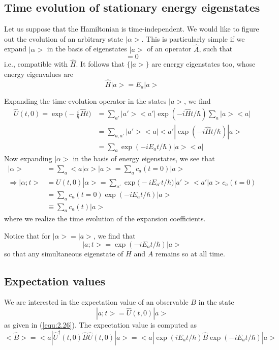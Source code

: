 \subsection{Time evolution of stationary energy eigenstates}
Let us suppose that the Hamiltonian is time-independent. We
would like to figure out the evolution of an arbitrary state
$|\alpha>$. This is particularly simple if we expand
$|\alpha>$ in the basis of eigenstates $|a>$ of an operator
$\hat{A}$, such that
\begin{equation}
  [\hat{A}, \hat{H}] = 0
  \label{equ:2.22}
\end{equation}
i.e., compatible with $\hat{H}$. It follows that $\{|a>\}$
are energy eigenstates too, whose energy eigenvalues are
\begin{equation}
  \hat{H} |a> = E_a |a>
  \label{equ:2.23}
\end{equation}

Expanding the time-evolution operator in the states $|a>$,
we find
\begin{align}
  \hat{U}(t, 0) = \exp\Big(-\frac{i}{\hbar} \hat{H}t\Big) &= 
  \sum_{a'} |a'><a'| \exp(-i \hat{H} t / \hbar) \sum_a
  |a><a|\nonumber\\
  &=
  \sum_{a,a'} |a'><a| <a'|\exp(-i\hat{H}t/\hbar)
  |a>\nonumber\\
  &=
  \sum_a \exp(-i E_a t /\hbar) |a><a|
  \label{equ:2.23}
\end{align}
Now expanding $|\alpha>$ in the basis of energy eigenstates,
we see that
\begin{align*}
|\alpha> &= \sum_a <a|\alpha> |a> = \sum_a c_a(t=0) |a>
  \nonumber\\
  \Rightarrow |\alpha;t> &= U(t,0) |\alpha> = \sum_{a'}
  \exp\Big(-i E_{a'}t/\hbar\Big) |a'><a'|a> c_a(t=0)
  \nonumber\\
  &=
  \sum_a c_a(t= 0) \exp(-iE_a t/\hbar) |a>\\
  &\equiv \sum_a c_a(t) |a> \label{equ:2.24}
\end{align*}
where we realize the time evolution of the expansion
coefficients.

Notice that for $|\alpha> = |a>$, we find that
\begin{equation}
  |a;t> = \exp(-i E_a t/\hbar) |a>
  \label{equ:2.25}
\end{equation}
so that any simultaneous eigenstate of $H$ and $A$ remains
so at all time.
\subsection{Expectation values}
We are interested in the expectation value of an observable
$B$ in the state
$$
  |a;t> = \hat{U}(t,0) |a>
$$
as given in (\ref{equ:2.26}). The expectation value is
computed as
$$
<\hat{B}> = <a|\hat{U}^{\dagger}(t,0) \hat{B} \hat{U}(t,0) |a>
= 
<a|\exp(iE_a t/\hbar) \hat{B} \exp(-i E_a t/\hbar) |a>
$$

